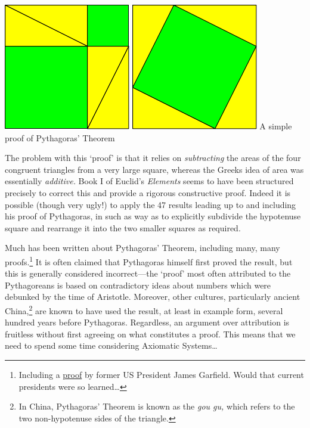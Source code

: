 \begin{center}
	\includegraphics[width=0.3\linewidth]{pythag}
	\qquad\qquad\qquad\qquad
	\includegraphics[width=0.3\linewidth]{pythag2}
	\medbreak
	A simple proof of Pythagoras' Theorem
\end{center}
The problem with this `proof' is that it relies on \emph{subtracting} the areas of the four congruent triangles from a very large square, whereas the Greeks idea of area was essentially \emph{additive.} Book I of Euclid's \emph{Elements} seems to have been structured precisely to correct this and provide a rigorous constructive proof. Indeed it is possible (though very ugly!) to apply the 47 results leading up to and including his proof of Pythagoras, in such as way as to explicitly subdivide the hypotenuse square and rearrange it into the two smaller squares as required.
\smallbreak


Much has been written about Pythagoras' Theorem, including many, many proofs.\footnote{Including a \href{https://www.maa.org/press/periodicals/convergence/mathematical-treasure-james-a-garfields-proof-of-the-pythagorean-theorem}{proof} by former US President James Garfield. Would that current presidents were so learned\ldots} It is often claimed that Pythagoras himself first proved the result, but this is generally considered incorrect---the `proof' most often attributed to the Pythagoreans is based on contradictory ideas about numbers which were debunked by the time of Aristotle. Moreover, other cultures, particularly ancient China,\footnote{In China, Pythagoras' Theorem is known as the \emph{gou gu,} which refers to the two non-hypotenuse sides of the triangle.} are known to have used the result, at least in example form, several hundred years before Pythagoras. Regardless, an argument over attribution is fruitless without first agreeing on what constitutes a proof. This means that we need to spend some time considering Axiomatic Systems\ldots 


